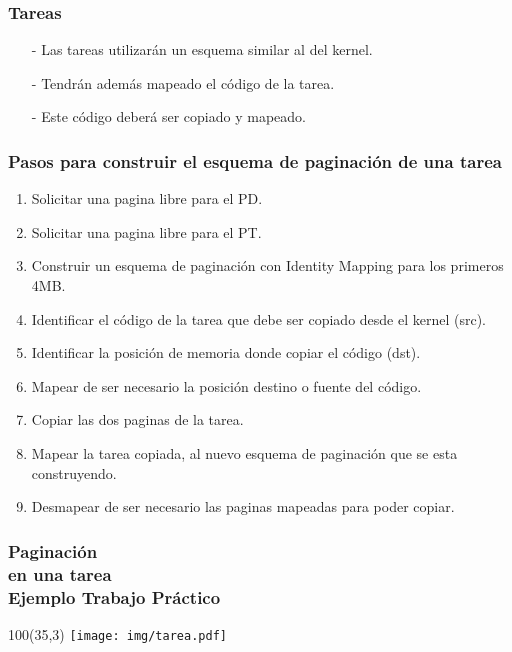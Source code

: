 \documentclass[aspectratio=169]{beamer}
\begin{document}
\begin{frame}
    \frametitle{Tareas}
    \Large
    \begin{itemize}
    \setlength\itemsep{0.3cm}
    \item[-] Las tareas utilizarán un esquema similar al del kernel.
    \item[-] Tendrán además mapeado el código de la tarea.
    \item[-] Este código deberá ser copiado y mapeado.
    \end{itemize}
\end{frame}

\begin{frame}
    \frametitle{Pasos para construir el esquema de paginación de una tarea}
    \begin{enumerate}
    \setlength\itemsep{0.3cm}
    \item Solicitar una pagina libre para el PD.
    \pause
    \item Solicitar una pagina libre para el PT.
    \pause
    \item Construir un esquema de paginación con Identity Mapping para los primeros 4MB.
    \pause
    \item Identificar el código de la tarea que debe ser copiado desde el kernel (src).
    \pause
    \item Identificar la posición de memoria donde copiar el código (dst).
    \pause
    \item Mapear de ser necesario la posición destino o fuente del código.
    \pause
    \item Copiar las dos paginas de la tarea.
    \pause
    \item Mapear la tarea copiada, al nuevo esquema de paginación que se esta construyendo.
    \pause
    \item Desmapear de ser necesario las paginas mapeadas para poder copiar.
    \end{enumerate}
\end{frame}

\begin{frame}
    \frametitle{Paginación\\ en una tarea\\ \small Ejemplo Trabajo Práctico }
    \begin{textblock}{100}(35,3) \texttt{[image: img/tarea.pdf]} \end{textblock}
\end{frame}
\end{document}
